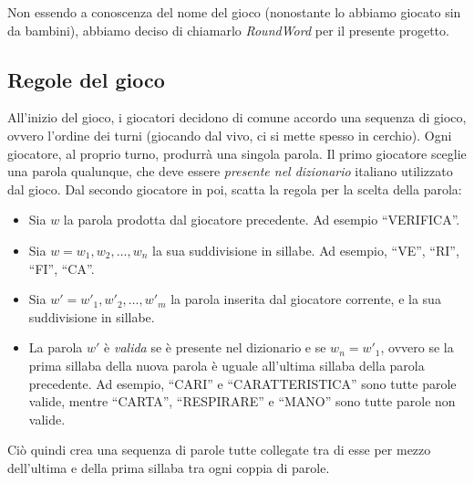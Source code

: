 \documentclass[9pt]{article}
\begin{document}

Non essendo a conoscenza del nome del gioco (nonostante lo abbiamo giocato sin da bambini), abbiamo deciso di chiamarlo \emph{RoundWord} per il presente progetto.



\subsection{Regole del gioco}
All'inizio del gioco, i giocatori decidono di comune accordo una sequenza di gioco, ovvero l'ordine dei turni (giocando dal vivo, ci si mette spesso in cerchio). Ogni giocatore, al proprio turno, produrrà una singola parola. Il primo giocatore sceglie una parola qualunque, che deve essere \emph{presente nel dizionario} italiano utilizzato dal gioco. Dal secondo giocatore in poi, scatta la regola per la scelta della parola:

\begin{itemize}
\item Sia $w$ la parola prodotta dal giocatore precedente. Ad esempio ``VERIFICA''.
\item Sia $w=w_1, w_2, \dots, w_n$ la sua suddivisione in sillabe. Ad esempio, ``VE'', ``RI'', ``FI'', ``CA''.
\item Sia $w'=w'_1, w'_2, \dots, w'_m$ la parola inserita dal giocatore corrente, e la sua suddivisione in sillabe.
\item La parola $w'$ è \emph{valida} se è presente nel dizionario e se $w_n = w'_1$, ovvero se la prima sillaba della nuova parola è uguale all'ultima sillaba della parola precedente. Ad esempio, ``CARI'' e ``CARATTERISTICA'' sono tutte parole valide, mentre ``CARTA'', ``RESPIRARE'' e ``MANO'' sono tutte parole non valide.
\end{itemize}

Ciò quindi crea una sequenza di parole tutte collegate tra di esse per mezzo dell'ultima e della prima sillaba tra ogni coppia di parole. 
\end{document}
